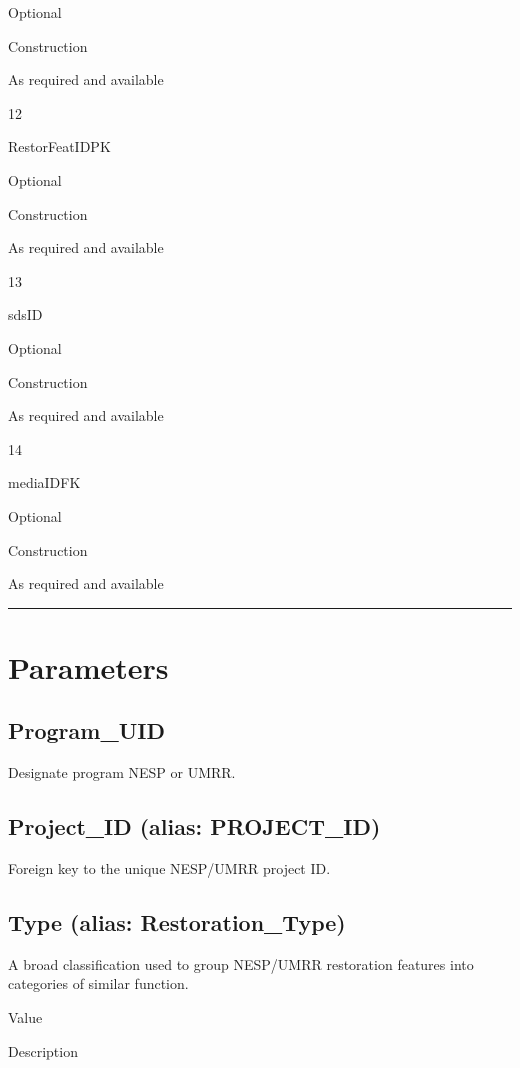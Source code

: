\documentclass[
  letterpaper,
  DIV=11,
  numbers=noendperiod]{scrreprt}
\begin{document}
Optional

Construction

As required and available

12

RestorFeatIDPK

Optional

Construction

As required and available

13

sdsID

Optional

Construction

As required and available

14

mediaIDFK

Optional

Construction

As required and available

\begin{center}\rule{0.5\linewidth}{0.5pt}\end{center}

\section{Parameters}\label{parameters-21}

\subsection{Program\_UID}\label{program_uid-21}

Designate program NESP or UMRR.

\subsection{Project\_ID (alias:
PROJECT\_ID)}\label{project_id-alias-project_id-21}

Foreign key to the unique NESP/UMRR project ID.

\subsection{Type (alias:
Restoration\_Type)}\label{type-alias-restoration_type-2}

A broad classification used to group NESP/UMRR restoration features into
categories of similar function.

Value

Description
\end{document}
